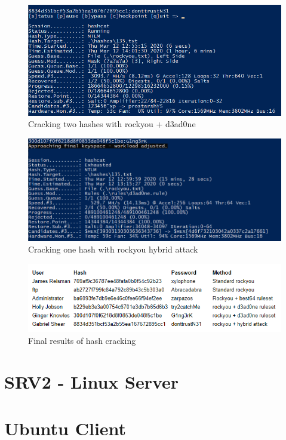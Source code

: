 \documentclass{report}
\begin{document}
\begin{figure}[!htb]
	\centering
	\includegraphics[scale=0.6]{img/hashdump4.png}
	\caption{Cracking two hashes with rockyou + d3ad0ne}
\end{figure}
\begin{figure}[!htb]
	\centering
	\includegraphics[scale=0.6]{img/hashdump5.png}
	\caption{Cracking one hash with rockyou hybrid attack}
\end{figure}
\begin{figure}[!htb]
	\centering
	\includegraphics[scale=0.6]{img/hashdump6.png}
	\caption{Final results of hash cracking}
\end{figure}
\pagebreak

\section{SRV2 - Linux Server}

\section{Ubuntu Client}
\end{document}

